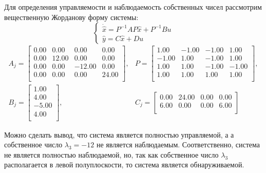 Для определения управляемости и наблюдаемость собственных чисел рассмотрим вещественную Жорданову форму системы:
\begin{equation}
    \begin{cases}
        \dot{\hat{x}} = P^{-1}AP\hat{x} + P^{-1}Bu \\
        \hat{y} = C\hat{x} + Du
    \end{cases}
\end{equation}
\begin{equation}
    \begin{array}{cccc}
        A_j = \begin{bmatrix}
            0.00  & 0.00  & 0.00  & 0.00 \\ 
            0.00  & 12.00  & 0.00  & 0.00 \\ 
            0.00  & 0.00  & -12.00  & 0.00 \\ 
            0.00  & 0.00  & 0.00  & 24.00 \\ 
            \end{bmatrix}, &
        P = \begin{bmatrix}
            1.00  & -1.00  & -1.00  & 1.00 \\ 
            -1.00  & 1.00  & -1.00  & 1.00 \\ 
            1.00  & 1.00  & -1.00  & -1.00 \\ 
            1.00  & 1.00  & 1.00  & 1.00 \\ 
            \end{bmatrix}, \\
        B_j = \begin{bmatrix}
            1.00 \\ 
            4.00 \\ 
            -5.00 \\ 
            4.00 \\ 
            \end{bmatrix}, & 
        C_j = \begin{bmatrix}
            0.00  & 24.00  & 0.00  & 0.00 \\ 
            6.00  & 0.00  & 0.00  & 6.00 \\ 
        \end{bmatrix}
    \end{array}
\end{equation}

Можно сделать вывод, что система является полностью управляемой, а 
а собственное число $\lambda_3 = -12$ не является наблюдаемым. Соответственно, 
система не является полностью наблюдаемой, но, так как собственное число 
$\lambda_3$ располагается в левой полуплоскости, то система является обнаруживаемой. 


